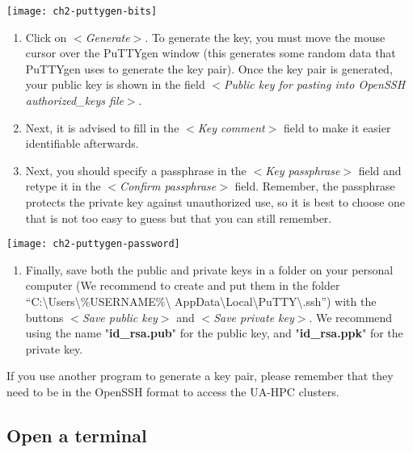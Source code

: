   \texttt{[image: ch2-puttygen-bits]}

  \begin{enumerate}
    \item  Click on $<$\textit{Generate}$>$. To generate the key, you must move
      the mouse cursor over the PuTTYgen window (this generates some random
      data that PuTTYgen uses to generate the key pair). Once the key pair is
      generated, your public key is shown in the field $<$\textit{Public key for pasting into OpenSSH authorized\_keys file}$>$.
    \item  Next, it is advised to fill in the $<$\textit{Key comment}$>$ field
      to make it easier identifiable afterwards.
    \item  Next, you should specify a passphrase in the $<$\textit{Key passphrase}$>$
      field and retype it in the $<$\textit{Confirm passphrase}$>$ field.
      Remember, the passphrase protects the private key against unauthorized
      use, so it is best to choose one that is not too easy to guess but that
      you can still remember.
  \end{enumerate}

  \texttt{[image: ch2-puttygen-password]}

  \begin{enumerate}
    \item  Finally, save both the public and private keys in a folder on your
      personal computer (We recommend to create and put them in the folder
      ``C:\textbackslash Users\textbackslash \%USERNAME\%\textbackslash
      AppData\textbackslash Local\textbackslash PuTTY\textbackslash .ssh'')
      with the buttons $<$\textit{Save public key}$>$ and $<$\textit{Save private key}$>$.
      We recommend using the name "\textbf{id\_rsa.pub}" for the public key,
      and "\textbf{id\_rsa.ppk}" for the private key.
  \end{enumerate}

  If you use another program to generate a key pair, please remember that they need to be in the OpenSSH format to access the UA-HPC clusters.

\fi



  \subsection{Open a terminal}
  \label{subsec:open-a-terminal}

